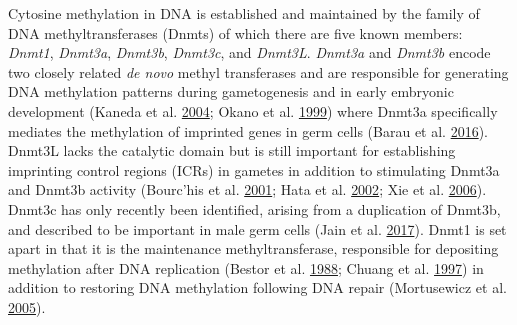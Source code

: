 \documentclass[onehalf,12pt]{beavtex}
\begin{document}
  Cytosine methylation in DNA is established and maintained by the family
  of DNA methyltransferases (Dnmts) of which there are five known members:
  \emph{Dnmt1}, \emph{Dnmt3a}, \emph{Dnmt3b}, \emph{Dnmt3c}, and
  \emph{Dnmt3L}. \emph{Dnmt3a} and \emph{Dnmt3b} encode two closely
  related \emph{de novo} methyl transferases and are responsible for
  generating DNA methylation patterns during gametogenesis and in early
  embryonic development (Kaneda et al.
  \protect\hyperlink{ref-KanedaEssentialrolenovo2004}{2004}; Okano et al.
  \protect\hyperlink{ref-OkanoDNAmethyltransferasesDnmt3a1999}{1999})
  where Dnmt3a specifically mediates the methylation of imprinted genes in
  germ cells (Barau et al.
  \protect\hyperlink{ref-BarauDNAmethyltransferaseDNMT3C2016b}{2016}).
  Dnmt3L lacks the catalytic domain but is still important for
  establishing imprinting control regions (ICRs) in gametes in addition to
  stimulating Dnmt3a and Dnmt3b activity (Bourc'his et al.
  \protect\hyperlink{ref-BourchisDnmt3Lestablishmentmaternal2001}{2001};
  Hata et al. \protect\hyperlink{ref-HataDnmt3LcooperatesDnmt32002}{2002};
  Xie et al.
  \protect\hyperlink{ref-XieMutationsDNAmethyltransferase2006}{2006}).
  Dnmt3c has only recently been identified, arising from a duplication of
  Dnmt3b, and described to be important in male germ cells (Jain et al.
  \protect\hyperlink{ref-Jainrahumutantallele2017}{2017}). Dnmt1 is set
  apart in that it is the maintenance methyltransferase, responsible for
  depositing methylation after DNA replication (Bestor et al.
  \protect\hyperlink{ref-BestorCloningsequencingcDNA1988}{1988}; Chuang et
  al. \protect\hyperlink{ref-ChuangHumanDNAcytosine51997}{1997}) in
  addition to restoring DNA methylation following DNA repair (Mortusewicz
  et al.
  \protect\hyperlink{ref-MortusewiczRecruitmentDNAmethyltransferase2005a}{2005}).
  
\end{document}
